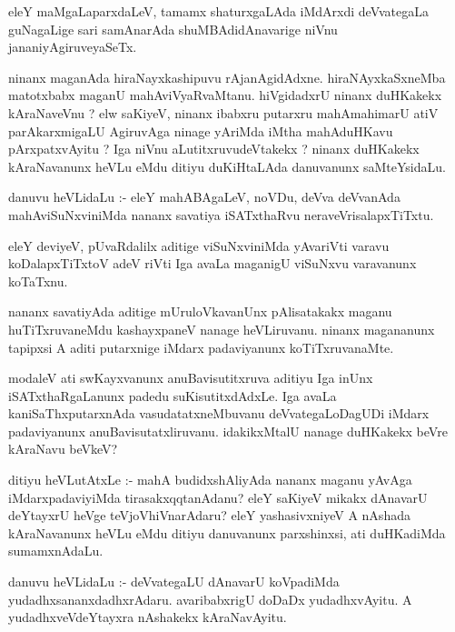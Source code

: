 \documentclass{article}
\begin{document}
\begin{mn}
eleY maMgaLaparxdaLeV, tamamx shaturxgaLAda iMdArxdi deVvategaLa 
guNagaLige sari samAnarAda shuMBAdidAnavarige niVnu jananiyAgiruveyaSeTx.
\end{mn}

\begin{mn}
ninanx maganAda hiraNayxkashipuvu rAjanAgidAdxne. hiraNAyxkaSxneMba 
matotxbabx maganU mahAviVyaRvaMtanu. hiVgidadxrU ninanx duHKakekx 
kAraNaveVnu ? elw saKiyeV, ninanx ibabxru putarxru mahAmahimarU atiV 
parAkarxmigaLU  AgiruvAga ninage yAriMda  iMtha mahAduHKavu 
pArxpatxvAyitu ? Iga niVnu aLutitxruvudeVtakekx ? ninanx duHKakekx 
kAraNavanunx heVLu eMdu ditiyu duKiHtaLAda danuvanunx saMteYsidaLu.
\end{mn}

\begin{mn}
danuvu heVLidaLu :- eleY mahABAgaLeV, noVDu, deVva deVvanAda 
mahAviSuNxviniMda nananx savatiya iSATxthaRvu neraveVrisalapxTiTxtu.
\end{mn}

\begin{mn}
eleY deviyeV, pUvaRdalilx aditige viSuNxviniMda yAvariVti varavu 
koDalapxTiTxtoV adeV riVti Iga avaLa maganigU viSuNxvu varavanunx koTaTxnu.
\end{mn}

\begin{mn}
nananx savatiyAda aditige mUruloVkavanUnx pAlisatakakx maganu huTiTxruvaneMdu 
kashayxpaneV nanage heVLiruvanu.  ninanx magananunx tapipxsi A aditi putarxnige 
iMdarx padaviyanunx koTiTxruvanaMte.
\end{mn}

\begin{mn}
modaleV ati swKayxvanunx anuBavisutitxruva aditiyu Iga inUnx iSATxthaRgaLanunx
padedu suKisutitxdAdxLe. Iga avaLa kaniSaThxputarxnAda vasudatatxneMbuvanu 
deVvategaLoDagUDi iMdarx padaviyanunx anuBavisutatxliruvanu.  idakikxMtalU 
nanage duHKakekx beVre kAraNavu beVkeV?
\end{mn}

\begin{mn}
ditiyu heVLutAtxLe :- mahA budidxshAliyAda nananx maganu yAvAga 
iMdarxpadaviyiMda tirasakxqqtanAdanu? eleY saKiyeV mikakx dAnavarU deYtayxrU
heVge teVjoVhiVnarAdaru?  eleY yashasivxniyeV A nAshada kAraNavanunx heVLu 
eMdu ditiyu danuvanunx parxshinxsi, ati duHKadiMda sumamxnAdaLu.
\end{mn}

\begin{mn}
danuvu heVLidaLu :- deVvategaLU dAnavarU koVpadiMda yudadhxsananxdadhxrAdaru. 
avaribabxrigU doDaDx yudadhxvAyitu.  A yudadhxveVdeYtayxra nAshakekx kAraNavAyitu.
\end{mn}
\end{document}
